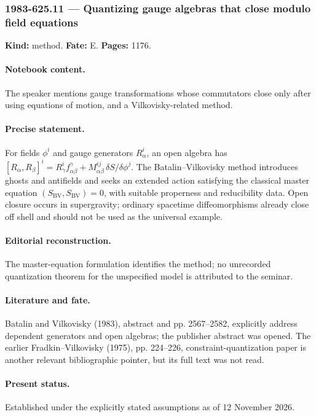 \subsubsection{1983-625.11 --- Quantizing gauge algebras that close modulo field equations}

\label{item:1983-625.11}

\noindent\textbf{Kind:} method. \textbf{Fate:} E. \textbf{Pages:} 1176.\par

\paragraph{Notebook content.} The speaker mentions gauge transformations whose commutators close only after using equations of motion, and a Vilkovisky-related method.

\paragraph{Precise statement.} For fields \(\phi^i\) and gauge generators \(R^i_\alpha\), an open algebra has \([R_\alpha,R_\beta]^i=R^i_\gamma f^\gamma_{\alpha\beta}+M^{ij}_{\alpha\beta}\,\delta S/\delta\phi^j\). The Batalin–Vilkovisky method introduces ghosts and antifields and seeks an extended action satisfying the classical master equation \((S_{\mathrm{BV}},S_{\mathrm{BV}})=0\), with suitable properness and reducibility data. Open closure occurs in supergravity; ordinary spacetime diffeomorphisms already close off shell and should not be used as the universal example.

\paragraph{Editorial reconstruction.} The master-equation formulation identifies the method; no unrecorded quantization theorem for the unspecified model is attributed to the seminar.

\paragraph{Literature and fate.} Batalin and Vilkovisky (1983), abstract and pp. 2567–2582, explicitly address dependent generators and open algebras; the publisher abstract was opened. The earlier Fradkin–Vilkovisky (1975), pp. 224–226, constraint-quantization paper is another relevant bibliographic pointer, but its full text was not read.

\paragraph{Present status.} Established under the explicitly stated assumptions as of 12 November 2026.

